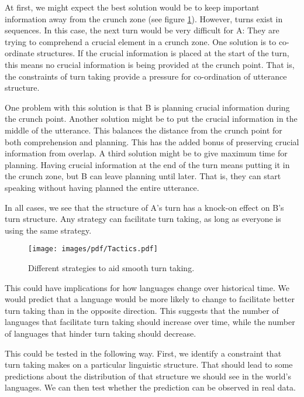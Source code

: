 \documentclass[12pt]{article}
\begin{document}
At first, we might expect the best solution would be to keep important information away from the crunch zone (see figure \ref{fig:strategies}).  
However, turns exist in sequences.  In this case, the next turn would be very difficult for A:  They are trying to comprehend a crucial element in a crunch zone.  One solution is to co-ordinate structures.  If the crucial information is placed at the start of the turn, this means no crucial information is being provided at the crunch point.  That is, the constraints of turn taking provide a pressure for co-ordination of utterance structure.  

One problem with this solution is that B is planning crucial information during the crunch point.  Another solution might be to put the crucial information in the middle of the utterance.  This balances the distance from the crunch point for both comprehension and planning.
This has the added bonus of preserving crucial information from overlap.  A third solution might be to give maximum time for planning.  Having crucial information at the end of the turn means putting it in the crunch zone, but B can leave planning until later.  That is, they can start speaking without having planned the entire utterance.

In all cases, we see that the structure of A's turn has a knock-on effect on B's turn structure.  Any strategy can facilitate turn taking, as long as everyone is using the same strategy.

\begin{figure}[htbp]
\begin{center}
\texttt{[image: images/pdf/Tactics.pdf]}
\caption{Different strategies to aid smooth turn taking.}
\label{fig:strategies}
\end{center}
\end{figure}

This could have implications for how languages change over historical time.
We would predict that a language would be more likely to change to facilitate better turn taking than in the opposite direction.  This suggests that the number of languages that facilitate turn taking should increase over time, while the number of languages that hinder turn taking should decrease.  

This could be tested in the following way.  First, we identify a constraint that turn taking makes on a particular linguistic structure.  That should lead to some predictions about the distribution of that structure we should see in the world's languages.  We can then test whether the prediction can be observed in real data.  
\end{document}
